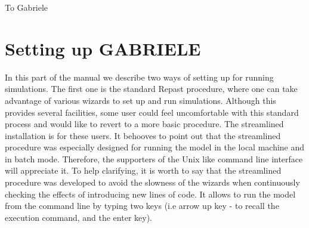\documentclass{book}
\begin{document}
\newpage
\thispagestyle{empty}

\null

\newpage
\thispagestyle{empty}

\vspace*{5cm}
\begin{flushright}
	To Gabriele
\end{flushright}

\newpage
\thispagestyle{empty}

\null

\newpage


\tableofcontents
 





\printglossaries

\clearpage
\thispagestyle{empty}

\part{Setting up GABRIELE}


In this part of the manual we describe two ways of setting up for running simulations. The first one is the standard Repast procedure, where one can take advantage of various wizards to set up and run simulations. Although this provides several facilities, some user could feel uncomfortable with this standard process and would like to revert to a more basic procedure. The streamlined installation is for these users. It behooves to point out that the streamlined procedure was especially designed for running the model in the local machine and in batch mode. Therefore, the supporters of the Unix like command line interface will appreciate it. To help clarifying, it is worth to say that the streamlined procedure was developed to avoid the slowness of the wizards when continuously checking the effects of introducing new lines of code. It allows to run the model from the command line by typing two keys (i.e arrow up key - to recall the execution command, and the enter key). 
\end{document}
